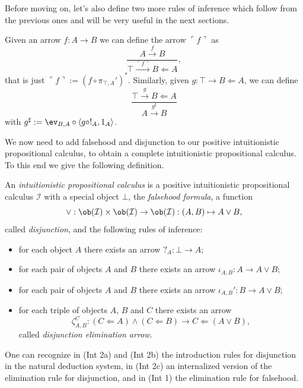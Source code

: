Before moving on, let's also define two more rules of inference which follow from the previous ones and will be very useful in the next sections.

\begin{example}
    Given an arrow $f : A \to B$ we can define the arrow $\ulcorner f \urcorner$ as
    \[ \frac{A \xrightarrow{f} B}{\top \xrightarrow{\ulcorner f \urcorner} B \Leftarrow A}, \]
    that is just $\ulcorner f \urcorner := (f \circ \pi_{\top,A}')^*$. Similarly, given $g : \top \to B \Leftarrow A$, we can define 
    \[ \frac{\top \xrightarrow{g} B \Leftarrow A}{A \xrightarrow{g^\sharp} B} \]
    with $g^\sharp := \ev_{B,A} \circ \langle g\circ !_A,1_A\rangle$. 
\end{example}

We now need to add falsehood and disjunction to our positive intuitionistic propositional calculus, to obtain a complete intuitionistic propositional calculus.
To this end we give the following definition.

\begin{definition}
    An \textit{intuitionistic propositional calculus} is a positive intuitionistic propositional calculus $\mathcal I$ with a special object $\bot$, the \textit{falsehood formula}, a function
    \[ \lor : \ob(\mathcal I)\times\ob(\mathcal I) \to \ob(\mathcal I) : (A,B) \mapsto A \lor B, \]
    called \textit{disjunction}, and the following rules of inference:
    \begin{itemize}
        \item[(\textnormal{Int 1})] for each object $A$ there exists an arrow $?_A : \bot \to A$;
        \item[(\textnormal{Int 2a})] for each pair of objects $A$ and $B$ there exists an arrow $\iota_{A,B} : A \to A \lor B$;
        \item[(\textnormal{Int 2b})] for each pair of objects $A$ and $B$ there exists an arrow $\iota_{A,B}' : B \to A \lor B$;
        \item[(\textnormal{Int 2c})] for each triple of objects $A$, $B$ and $C$ there exists an arrow
        \[ \zeta_{A,B}^C : (C \Leftarrow A) \land (C \Leftarrow B) \to C \Leftarrow (A \lor B),\]
        called \textit{disjunction elimination arrow}.
    \end{itemize}
\end{definition}

\begin{remark}
    One can recognize in (Int 2a) and (Int 2b) the introduction rules for disjunction in the natural deduction system,
    in (Int 2c) an internalized version of the elimination rule for disjunction, and in (Int 1) the elimination rule for falsehood.
\end{remark}

